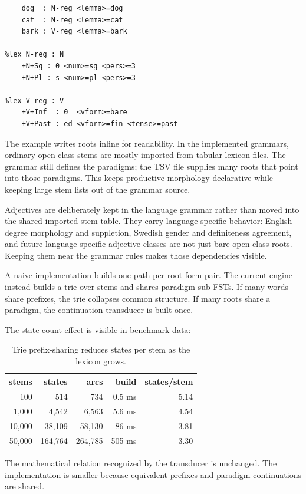 \documentclass[11pt]{article}
\theoremstyle{definition}
\theoremstyle{plain}
\theoremstyle{remark}
\begin{document}
\begin{lstlisting}[language=gram]
%lex Root
    dog  : N-reg <lemma>=dog
    cat  : N-reg <lemma>=cat
    bark : V-reg <lemma>=bark

%lex N-reg : N
    +N+Sg : 0 <num>=sg <pers>=3
    +N+Pl : s <num>=pl <pers>=3

%lex V-reg : V
    +V+Inf  : 0  <vform>=bare
    +V+Past : ed <vform>=fin <tense>=past
\end{lstlisting}

The example writes roots inline for readability. In the implemented grammars,
ordinary open-class stems are mostly imported from tabular lexicon files. The
grammar still defines the paradigms; the TSV file supplies many roots that point
into those paradigms. This keeps productive morphology declarative while keeping
large stem lists out of the grammar source.

Adjectives are deliberately kept in the language grammar rather than moved into
the shared imported stem table. They carry language-specific behavior: English
degree morphology and suppletion, Swedish gender and definiteness agreement, and
future language-specific adjective classes are not just bare open-class roots.
Keeping them near the grammar rules makes those dependencies visible.

A naive implementation builds one path per root-form pair. The current engine instead builds a
trie over stems and shares paradigm sub-FSTs. If many words share prefixes, the trie collapses
common structure. If many roots share a paradigm, the continuation transducer is built once.

The state-count effect is visible in benchmark data:

\begin{table}[h]
\centering
\begin{tabular}{@{}rrrrr@{}}
\toprule
stems & states & arcs & build & states/stem \\
\midrule
100 & 514 & 734 & 0.5 ms & 5.14 \\
1,000 & 4,542 & 6,563 & 5.6 ms & 4.54 \\
10,000 & 38,109 & 58,130 & 86 ms & 3.81 \\
50,000 & 164,764 & 264,785 & 505 ms & 3.30 \\
\bottomrule
\end{tabular}
\caption{Trie prefix-sharing reduces states per stem as the lexicon grows.}
\end{table}

The mathematical relation recognized by the transducer is unchanged. The implementation is
smaller because equivalent prefixes and paradigm continuations are shared.
\end{document}
